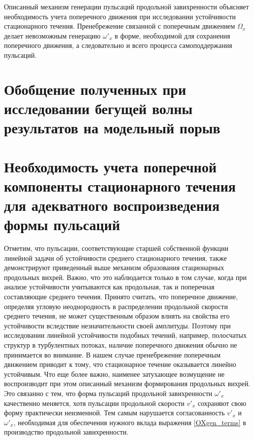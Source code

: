 Описанный механизм генерации пульсаций продольной завихренности объясняет необходимость учета поперечного движения при исследовании устойчивости стационарного течения. Пренебрежение связанной с поперечным движением $\Omega_x$ делает невозможным генерацию $\omega'_x$ в форме, необходимой для сохранения поперечного движения, а следовательно и всего процесса самоподдержания пульсаций.


\section{Обобщение полученных при исследовании бегущей волны результатов на модельный порыв}

\section{Необходимость учета поперечной компоненты стационарного течения для адекватного воспроизведения формы пульсаций}

Отметим, что пульсации, соответствующие старшей собственной функции линейной задачи об устойчивости среднего стационарного течения, также демонстрируют приведенный выше механизм образования стационарных продольных вихрей. Важно, что это наблюдается только в том случае, когда при анализе устойчивости учитываются как продольная, так и поперечная составляющие среднего течения. Принято считать, что поперечное движение, определяя угловую неоднородность в распределении продольной скорости среднего течения, не может существенным образом влиять на свойства его устойчивости вследствие незначительности своей амплитуды. Поэтому при исследовании линейной устойчивости подобных течений, например, полосчатых структур в турбулентных потоках, наличие поперечного движения обычно не принимается во внимание. В нашем случае пренебрежение поперечным движением приводит к тому, что стационарное течение оказывается линейно устойчивым. Что еще более важно, наименее затухающее возмущение не воспроизводит при этом описанный механизм формирования продольных вихрей. Это связанно с тем, что форма пульсаций продольной завихренности $\omega'_x$ качественно меняется, хотя пульсации продольной скорости $v'_x$ сохраняют свою форму практически неизменной. Тем самым нарушается согласованность  $v'_x$ и $\omega'_x$, необходимая для обеспечения нужного вклада выражения \eqref{OXgen_terms} в производство продольной завихренности.


